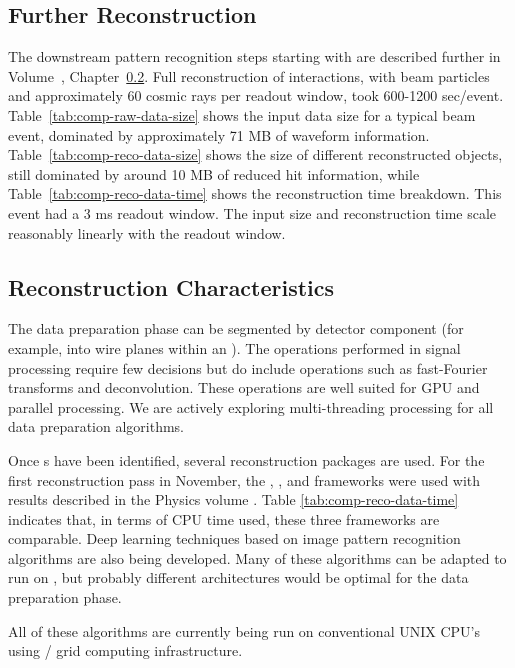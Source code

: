 \subsection{Further Reconstruction}
The downstream pattern recognition steps starting with  are described further in %
Volume~\volnumberphysics, Chapter~\ref{}.  
Full reconstruction of  interactions, with beam particles and approximately 60 cosmic rays per readout window, took 600-1200 sec/event.
Table~\ref{tab:comp-raw-data-size} shows the input data size for a typical beam event, dominated by approximately 71 MB of  waveform information.  Table~\ref{tab:comp-reco-data-size} shows the size of different reconstructed objects, still dominated by around 10 MB of reduced  hit information,  while Table~\ref{tab:comp-reco-data-time} shows the reconstruction time breakdown.  This event had a 3 ms readout window.  The input size and reconstruction time scale reasonably linearly with the readout window.  

\subsection{Reconstruction Characteristics}

The data preparation phase can be segmented by detector component (for example, into wire planes within an ).  The operations performed in signal processing require few decisions but do include operations such as fast-Fourier transforms and deconvolution.  These operations are well suited for GPU and parallel processing. We are actively exploring multi-threading processing for all data preparation algorithms.


Once s have been identified, several \threed  reconstruction packages are used. For the first reconstruction pass in November, the  \cite{Acciarri:2017hat}, \cite{wirecell}, and \cite{ref:PMA}  frameworks were used with results described in the Physics volume .   Table \ref{tab:comp-reco-data-time} indicates that, in terms of CPU time used, these three frameworks are comparable.   Deep learning techniques based on image pattern recognition algorithms are also being developed. Many of these algorithms can be adapted to run on , but probably different architectures would be optimal for the data preparation phase. 

All of these algorithms are currently being run on conventional UNIX CPU's using / grid computing  infrastructure. 



